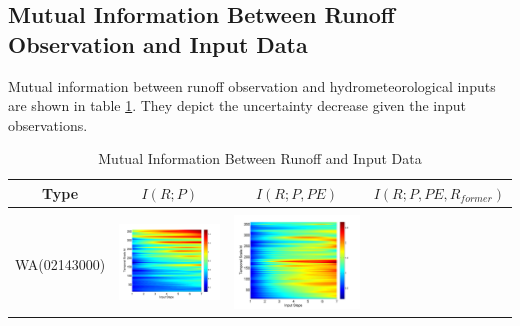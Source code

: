 \documentclass[draft,wrr]{AGUTeX}
\begin{document}
\begin{article}
\subsection{Mutual Information Between Runoff Observation and Input Data}
Mutual information between runoff observation and hydrometeorological inputs are shown in table \ref{MI}. They depict the uncertainty decrease given the input observations. 
\begin{table}[H]\small 
\caption{Mutual Information Between Runoff and Input Data}
\label{MI}
\centering
\begin{tabular}{cccc}
\hline
Type&$I(R;P)$&$I(R;P,PE)$&$I(R;P,PE,R_{former})$\\\hline
\\
WA(02143000)
&\begin{minipage}{.3\textwidth}\includegraphics[width=\linewidth]{resultgraph/02143000p.png}\end{minipage}
&\begin{minipage}{.3\textwidth}\includegraphics[width=\linewidth]{resultgraph/02143000pep.png}\end{minipage}

\end{tabular}
\end{table}
\end{article}
\end{document}
